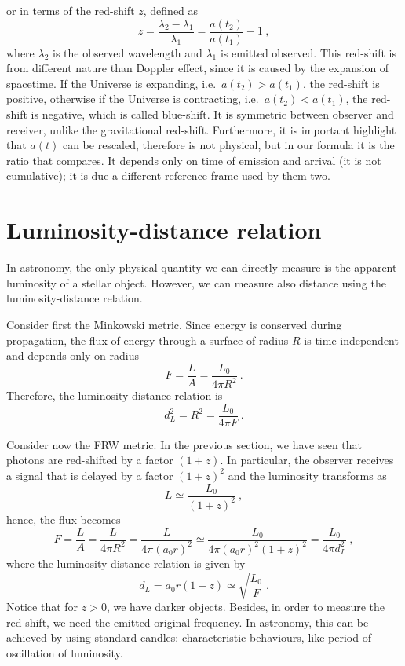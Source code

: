     or in terms of the red-shift $z$, defined as
    \begin{equation*}
        z = \frac{\lambda_2 - \lambda_1}{\lambda_1} = \frac{a(t_2)}{a(t_1)} - 1 ~,
    \end{equation*}
    where $\lambda_2$ is the observed wavelength and $\lambda_1$ is emitted observed. This red-shift is from different nature than Doppler effect, since it is caused by the expansion of spacetime. If the Universe is expanding, i.e.~$a(t_2) > a(t_1)$, the red-shift is positive, otherwise if the Universe is contracting, i.e.~$a(t_2) < a(t_1)$, the red-shift is negative, which is called blue-shift. It is symmetric between observer and receiver, unlike the gravitational red-shift. Furthermore, it is important highlight that $a(t)$ can be rescaled, therefore is not physical, but in our formula it is the ratio that compares. It depends only on time of emission and arrival (it is not cumulative); it is due a different reference frame used by them two.

\section{Luminosity-distance relation}

    In astronomy, the only physical quantity we can directly measure is the apparent luminosity of a stellar object. However, we can measure also distance using the luminosity-distance relation.
    
    Consider first the Minkowski metric. Since energy is conserved during propagation, the flux of energy through a surface of radius $R$ is time-independent and depends only on radius 
    \begin{equation*}
        F = \frac{L}{A} = \frac{L_0}{4 \pi R^2} ~.
    \end{equation*}
    Therefore, the luminosity-distance relation is 
    \begin{equation*}
        d_L^2 = R^2 = \frac{L_0}{4 \pi F} ~. 
    \end{equation*}

    Consider now the FRW metric. In the previous section, we have seen that photons are red-shifted by a factor $(1 + z)$. In particular, the observer receives a signal that is delayed by a factor $(1+z)^2$ and the luminosity transforms as
    \begin{equation*}
        L \simeq \frac{L_0}{(1 + z)^2} ~, 
    \end{equation*} 
    hence, the flux becomes
    \begin{equation*}
        F = \frac{L}{A} = \frac{L}{4 \pi R^2} = \frac{L}{4 \pi(a_0 r)^2} \simeq \frac{L_0}{4 \pi(a_0 r)^2 (1+z)^2} = \frac{L_0}{4 \pi d_L^2} ~,
    \end{equation*} 
    where the luminosity-distance relation is given by
    \begin{equation}
        d_L = a_0 r (1 + z) \simeq \sqrt{\frac{L_0}{F}} ~.
    \end{equation}
    Notice that for $z > 0$, we have darker objects. Besides, in order to measure the red-shift, we need the emitted original frequency. In astronomy, this can be achieved by using standard candles: characteristic behaviours, like period of oscillation of luminosity. 

